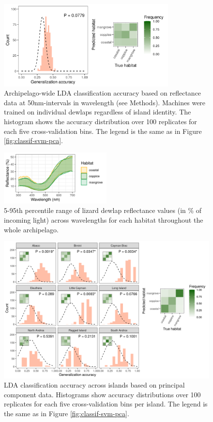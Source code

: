\begin{figure}[H]
	\centering
	\includegraphics[width=0.8\textwidth]{suppfigures/classif_lda_refl_pooled.png}
	\caption{Archipelago-wide LDA classification accuracy based on reflectance data at 50nm-intervals in wavelength (see Methods). Machines were trained on individual dewlaps regardless of island identity. The histogram shows the accuracy distribution over 100 replicates for each five cross-validation bins. The legend is the same as in Figure \ref{fig:classif-svm-pca}.}
	\label{supfig:classif-lda-refl-pooled}
\end{figure}

\begin{figure}[H]
	\centering
	\includegraphics[width=0.5\textwidth]{suppfigures/figure_reflectance_pooled.png}
	\caption{5-95th percentile range of lizard dewlap reflectance values (in \% of incoming light) across wavelengths for each habitat throughout the whole archipelago.}
	\label{supfig:reflectance-pooled}
\end{figure}

\begin{figure}[H]
	\centering
	\includegraphics[width=\textwidth]{suppfigures/classif_lda_pca.png}
	\caption{LDA classification accuracy across islands based on principal component data. Histograms show accuracy distributions over 100 replicates for each five cross-validation bins per island. The legend is the same as in Figure \ref{fig:classif-svm-pca}.}
	\label{supfig:classif-lda-pca}
\end{figure}

